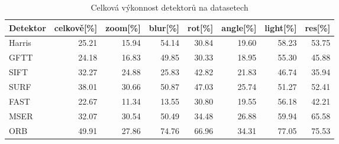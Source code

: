\begin{table}[htbp]\centering
\begin{tabular}{ l| r r r r r r r }
	Detektor & celkově[\%] & zoom[\%] & blur[\%] & rot[\%] & angle[\%] & light[\%] & res[\%] \\
	\hline
	 Harris & 25.21 & 15.94 & 54.14 & 30.84 & 19.60 & 58.23 & 53.75 \\
	 GFTT & 24.18 & 16.83 & 49.85 & 30.33 & 18.95 & 55.30 & 45.88 \\
	 SIFT & 32.27 & 24.88 & 25.83 & 42.82 & 21.83 & 46.74 & 35.94 \\
	 SURF & 38.01 & 30.66 & 50.87 & 47.03 & 25.74 & 51.27 & 52.41 \\
	 FAST & 22.67 & 11.34 & 13.55 & 30.80 & 19.55 & 56.18 & 42.21 \\
	 MSER & 32.07 & 30.54 & 50.49 & 34.48 & 26.88 & 59.94 & 65.58 \\
	 ORB & 49.91 & 27.86 & 74.76 & 66.96 & 34.31 & 77.05 & 75.53
\end{tabular}
	\caption[Short Heading]{\protect Celková výkonnost detektorů na datasetech}\label{tab_detperf}
\end{table}